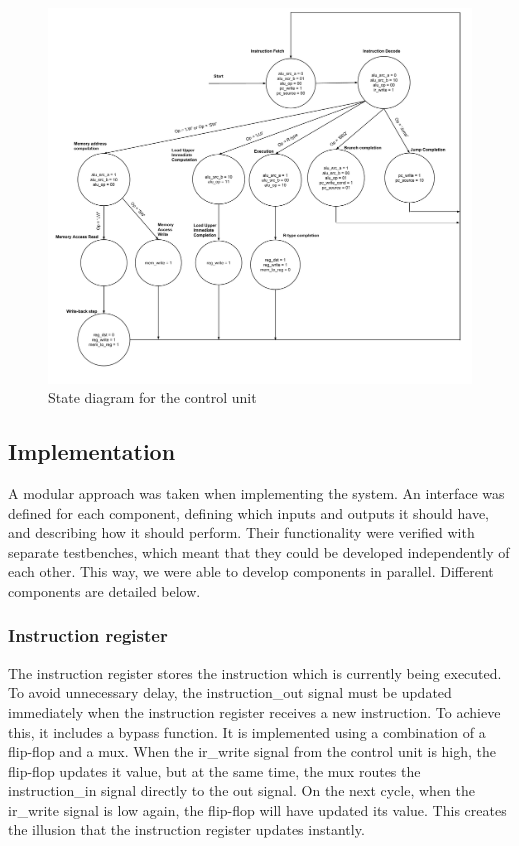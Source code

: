 \begin{figure}[ht!]
    \begin{center}
    \includegraphics[width=\textwidth]{assets/state_machine.pdf}
    \caption{State diagram for the control unit}
    \label{fig:state_machine}
    \end{center}
\end{figure}

\subsection{Implementation}

A modular approach was taken when implementing the system.
An interface was defined for each component, defining which inputs and outputs it should have,
and describing how it should perform.
Their functionality were verified with separate testbenches, which meant that they could be developed independently of each other.
This way, we were able to develop components in parallel.
Different components are detailed below.

\subsubsection{Instruction register}

The instruction register stores the instruction which is currently being executed.
To avoid unnecessary delay, the instruction\_out signal must be updated immediately when the instruction register receives a new instruction.
To achieve this, it includes a bypass function.
It is implemented using a combination of a flip-flop and a mux.
When the ir\_write signal from the control unit is high, the flip-flop updates it value,
but at the same time, the mux routes the instruction\_in signal directly to the out signal.
On the next cycle, when the ir\_write signal is low again, the flip-flop will have updated its value.
This creates the illusion that the instruction register updates instantly.

